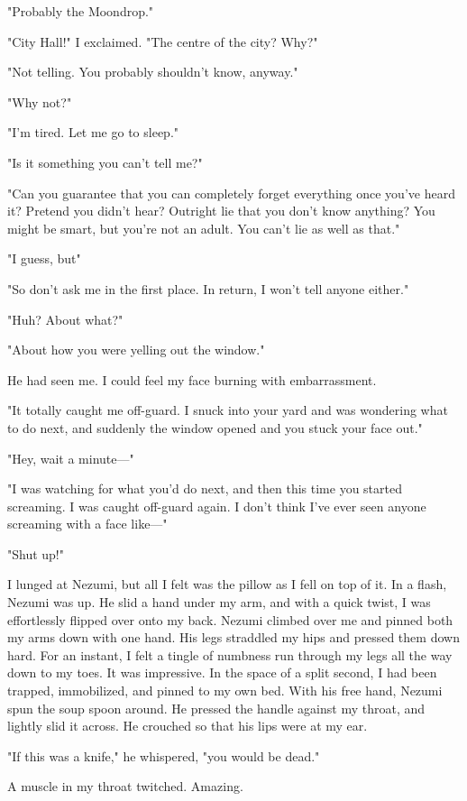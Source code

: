 "Probably the Moondrop."

"City Hall!" I exclaimed. "The centre of the city? Why?"

"Not telling. You probably shouldn't know, anyway."

"Why not?"

"I'm tired. Let me go to sleep."

"Is it something you can't tell me?"

"Can you guarantee that you can completely forget everything once you've
heard it? Pretend you didn't hear? Outright lie that you don't know
anything? You might be smart, but you're not an adult. You can't lie as
well as that."

"I guess, but\el "

"So don't ask me in the first place. In return, I won't tell anyone
either."

"Huh? About what?"

"About how you were yelling out the window."

He had seen me. I could feel my face burning with embarrassment.

"It totally caught me off-guard. I snuck into your yard and was
wondering what to do next, and suddenly the window opened and you stuck
your face out."

"Hey, wait a minute---"

"I was watching for what you'd do next, and then this time you started
screaming. I was caught off-guard again. I don't think I've ever seen
anyone screaming with a face like---"

"Shut up!"

I lunged at Nezumi, but all I felt was the pillow as I fell on top of
it. In a flash, Nezumi was up. He slid a hand under my arm, and with a
quick twist, I was effortlessly flipped over onto my back. Nezumi
climbed over me and pinned both my arms down with one hand. His legs
straddled my hips and pressed them down hard. For an instant, I felt a
tingle of numbness run through my legs all the way down to my toes. It
was impressive. In the space of a split second, I had been trapped,
immobilized, and pinned to my own bed. With his free hand, Nezumi spun
the soup spoon around. He pressed the handle against my throat, and
lightly slid it across. He crouched so that his lips were at my ear.

"If this was a knife," he whispered, "you would be dead."

A muscle in my throat twitched. Amazing.

